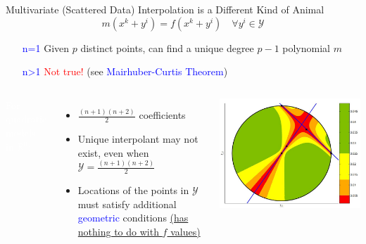 \documentclass[handout,aspectratio=54]{beamer}
\numberwithin{theorem}{section}
\begin{document}
\begin{frame}{Multivariate (Scattered Data) Interpolation is a Different Kind of Animal}
\begin{equation*}
m(x^k+y^i)=f(x^k+y^i)\quad\forall y^i\in\mathcal{Y}
\end{equation*}

\begin{itemize}
\item[\textcolor{blue}{n=1}] Given $p$ distinct points, can find a unique degree $p-1$ polynomial $m$
\item[\textcolor{blue}{n>1}] \textcolor{red}{Not true!} (see \textcolor{blue}{Mairhuber-Curtis Theorem})
\end{itemize}

\begin{columns}
\colorbox[rgb]{0.5,0.6,0.7}{\textcolor{white}{For quadratic models in $\mathbb{R}^n$:}}
\begin{itemize}\small
\item $\frac{(n+1)(n+2)}{2}$ coefficients
\item Unique interpolant may not exist, even when $\mathcal{Y}=\frac{(n+1)(n+2)}{2}$
\item Locations of the points in $\mathcal{Y}$ must satisfy additional \textcolor{blue}{geometric} conditions 
\underline{(has nothing to do with $f$ values)}
\end{itemize}

\includegraphics[width=\textwidth]{fig/28.jpg}
\scriptsize{}
\end{columns}
\end{frame}
\end{document}
